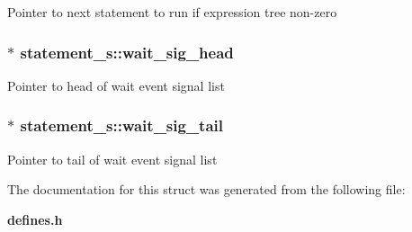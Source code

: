 Pointer to next statement to run if expression tree non-zero 
\subsubsection{$\ast$ {\bf statement\_\-s::wait\_\-sig\_\-head}}\label{structstatement__s_o1}


Pointer to head of wait event signal list 
\subsubsection{$\ast$ {\bf statement\_\-s::wait\_\-sig\_\-tail}}\label{structstatement__s_o2}


Pointer to tail of wait event signal list 

The documentation for this struct was generated from the following file:\begin{CompactItemize}
\item 
{\bf defines.h}\end{CompactItemize}
